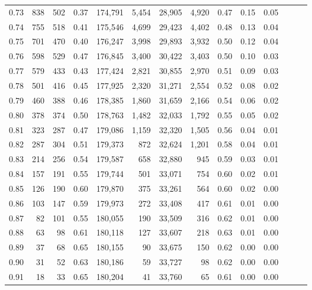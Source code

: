 \begin{tabular}{rrrrrrrrrrrrrr}
0.73 &    838 &  502 &  0.37 &  174,791 &    5,454 &  28,905 &   4,920 &  0.47 &  0.15 &      0.05 \\
0.74 &    755 &  518 &  0.41 &  175,546 &    4,699 &  29,423 &   4,402 &  0.48 &  0.13 &      0.04 \\
0.75 &    701 &  470 &  0.40 &  176,247 &    3,998 &  29,893 &   3,932 &  0.50 &  0.12 &      0.04 \\
0.76 &    598 &  529 &  0.47 &  176,845 &    3,400 &  30,422 &   3,403 &  0.50 &  0.10 &      0.03 \\
0.77 &    579 &  433 &  0.43 &  177,424 &    2,821 &  30,855 &   2,970 &  0.51 &  0.09 &      0.03 \\
0.78 &    501 &  416 &  0.45 &  177,925 &    2,320 &  31,271 &   2,554 &  0.52 &  0.08 &      0.02 \\
0.79 &    460 &  388 &  0.46 &  178,385 &    1,860 &  31,659 &   2,166 &  0.54 &  0.06 &      0.02 \\
0.80 &    378 &  374 &  0.50 &  178,763 &    1,482 &  32,033 &   1,792 &  0.55 &  0.05 &      0.02 \\
0.81 &    323 &  287 &  0.47 &  179,086 &    1,159 &  32,320 &   1,505 &  0.56 &  0.04 &      0.01 \\
0.82 &    287 &  304 &  0.51 &  179,373 &      872 &  32,624 &   1,201 &  0.58 &  0.04 &      0.01 \\
0.83 &    214 &  256 &  0.54 &  179,587 &      658 &  32,880 &     945 &  0.59 &  0.03 &      0.01 \\
0.84 &    157 &  191 &  0.55 &  179,744 &      501 &  33,071 &     754 &  0.60 &  0.02 &      0.01 \\
0.85 &    126 &  190 &  0.60 &  179,870 &      375 &  33,261 &     564 &  0.60 &  0.02 &      0.00 \\
0.86 &    103 &  147 &  0.59 &  179,973 &      272 &  33,408 &     417 &  0.61 &  0.01 &      0.00 \\
0.87 &     82 &  101 &  0.55 &  180,055 &      190 &  33,509 &     316 &  0.62 &  0.01 &      0.00 \\
0.88 &     63 &   98 &  0.61 &  180,118 &      127 &  33,607 &     218 &  0.63 &  0.01 &      0.00 \\
0.89 &     37 &   68 &  0.65 &  180,155 &       90 &  33,675 &     150 &  0.62 &  0.00 &      0.00 \\
0.90 &     31 &   52 &  0.63 &  180,186 &       59 &  33,727 &      98 &  0.62 &  0.00 &      0.00 \\
0.91 &     18 &   33 &  0.65 &  180,204 &       41 &  33,760 &      65 &  0.61 &  0.00 &      0.00 \\

\end{tabular}
